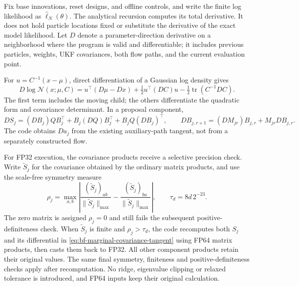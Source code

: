 Fix base innovations, reset designs, and offline controls, and write the
finite log likelihood as $\widehat\ell_N(\theta)$. The analytical recursion
computes its total derivative. It does not hold particle locations fixed or
substitute the derivative of the exact model likelihood. Let $D$ denote a
parameter-direction derivative on a neighborhood where the program is valid
and differentiable; it includes previous particles, weights, UKF covariances,
both flow paths, and the current evaluation point.

For $u=C^{-1}(x-\mu)$, direct differentiation of a Gaussian log density gives
\begin{equation}
 D\log\mathcal N(x;\mu,C)
 =u^\top(D\mu-Dx)+\tfrac12u^\top(DC)u
                         -\tfrac12\operatorname{tr}(C^{-1}DC).
 \label{eq:bf-marginal-gaussian-tangent}
\end{equation}
The first term includes the moving child; the others differentiate the
quadratic form and covariance determinant. In a proposal component,
\begin{equation}
 DS_j=(DB_j)QB_j^\top+B_j(DQ)B_j^\top+B_jQ(DB_j)^\top,\qquad
 DB_{j,r+1}=(DM_{jr})B_{j,r}+M_{jr}DB_{j,r}.
 \label{eq:bf-marginal-covariance-tangent}
\end{equation}
The code obtains $Da_j$ from the existing auxiliary-path tangent, not from
a separately constructed flow.

For FP32 execution, the covariance products receive a selective precision
check. Write $\widetilde S_j$ for the covariance obtained by the ordinary
matrix products, and use the scale-free symmetry measure
\begin{equation}
 \rho_j=\max_{a,b}\left|
 \frac{(\widetilde S_j)_{ab}}{\|\widetilde S_j\|_{\max}}-
 \frac{(\widetilde S_j)_{ba}}{\|\widetilde S_j\|_{\max}}\right|,
 \qquad \tau_d=8d\,2^{-23}.
 \label{eq:bf-marginal-symmetry-precision}
\end{equation}
The zero matrix is assigned $\rho_j=0$ and still fails the subsequent
positive-definiteness check. When $\widetilde S_j$ is finite and
$\rho_j>\tau_d$, the code recomputes both $S_j$ and its differential in
\eqref{eq:bf-marginal-covariance-tangent} using FP64 matrix products, then
casts them back to FP32. All other component products retain their original
values. The same final symmetry, finiteness and positive-definiteness checks
apply after recomputation. No ridge, eigenvalue clipping or relaxed tolerance
is introduced, and FP64 inputs keep their original calculation.

